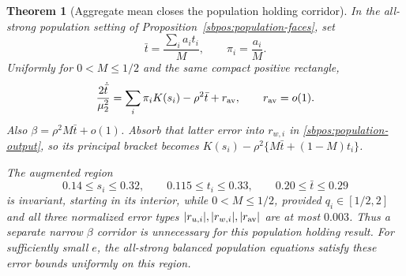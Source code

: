 \documentclass{article} %
\theoremstyle{plain}
\newtheorem{theorem}{Theorem}[section]
\theoremstyle{definition}
\theoremstyle{remark}
\begin{document}
\begin{theorem}[Aggregate mean closes the population holding corridor]
\label{sbpos:aggregate-mean}
In the all-strong population setting of Proposition~\ref{sbpos:population-faces},
set
\[
 \bar t=\frac{\sum_i a_it_i}{M},\qquad \pi_i=\frac{a_i}{M}.
\]
Uniformly for $0<M\le1/2$ and the same compact positive rectangle,
\begin{equation}\label{sbpos:mean-equation}
 \frac{2\dot{\bar t}}{\mu_2^2}
       =\sum_i\pi_iK(s_i)-\rho^2\bar t+r_{\rm av},
       \qquad r_{\rm av}=o(1).
\end{equation}
Also $\beta=\rho^2M\bar t+o(1)$. Absorb that latter error into
$r_{w,i}$ in \eqref{sbpos:population-output}, so its principal bracket
becomes $K(s_i)-\rho^2\{M\bar t+(1-M)t_i\}$.

The augmented region
\begin{equation}\label{sbpos:augmented-region}
 0.14\le s_i\le0.32,\qquad 0.115\le t_i\le0.33,\qquad
 0.20\le\bar t\le0.29
\end{equation}
is invariant, starting in its interior, while $0<M\le1/2$, provided
$q_i\in[1/2,2]$ and all three normalized error types
$|r_{u,i}|,|r_{w,i}|,|r_{\rm av}|$ are at most $0.003$.
Thus a separate narrow $\beta$ corridor is unnecessary for this
population holding result. For sufficiently small $e$, the all-strong
balanced population equations satisfy these error bounds uniformly on
this region.
\end{theorem}
\end{document}
